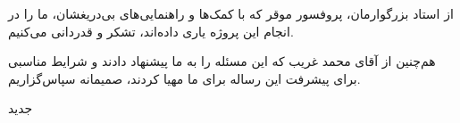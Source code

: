 

\begin{center}
\end{center}

از استاد بزرگوارمان، پروفسور موقر که با کمک‌ها و راهنمایی‌های بی‌دریغشان، ما را در انجام این پروژه یاری داده‌اند، تشکر و قدردانی می‌کنیم.

هم‌چنین از آقای محمد غریب که این مسئله را به ما پیشنهاد دادند و شرایط مناسبی برای پیشرفت این رساله برای ما مهیا کردند، صمیمانه سپاس‌گزاریم.

‌جدید
